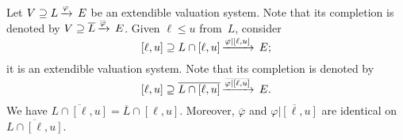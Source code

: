 \documentclass[main.tex]{subfiles}
\begin{document}
%
%
\begin{prop}
\label{P:restriction}
Let $V \supseteq L\,\smash{\xrightarrow{\varphi}\,E}$ be an extendible valuation system.
Note that its completion is denoted by
$V \supseteq \overline L\,\smash{\xrightarrow{\overline \varphi}\,E}$.
Given $\ell \leq u$ from~$L$,
consider
\begin{equation*}
[\ell,u] \supseteq L\cap{[\ell, u]}\,\smash{\xrightarrow{\varphi|[\ell,u]}\,E};
\end{equation*}
it is an extendible valuation system.
Note that its completion is denoted by
\begin{equation*}
[\ell,u] \supseteq \overline{L\cap[\ell,u]}\,\smash{\xrightarrow{\overline{\varphi|[\ell,u]}}\,E}.
\end{equation*}
We have $\overline{L\cap [\ell, u]} = \overline{L}\cap [\ell,u]$.
Moreover,
 $\overline{\varphi}$ and $\overline{\varphi|[\ell,u]}$
are identical on $\overline{L\cap [\ell,u]}$.
\end{prop}
\end{document}
